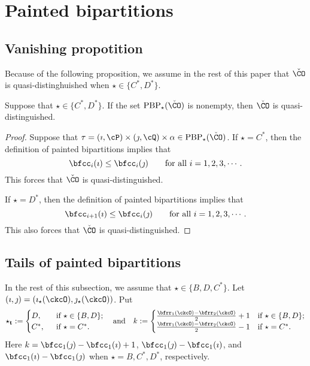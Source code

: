 \documentclass[ssunip]{subfiles}
\begin{document}
\def\oAC#1{\AC(#1)}
\def\pAC#1{\Lambda_{+}(#1)}
\def\nAC#1{\Lambda_{-}(#1)}

\section{Painted bipartitions}


\subsection{Vanishing propotition}
Because of the following proposition, we assume in the rest of this paper that $\check \CO$ is quasi-distinghuished  when $\star\in \{C^*, D^*\}$.


\begin{prop}
  Suppose that $\star\in \{C^*, D^*\}$. If the set $\mathrm{PBP}_\star(\check \CO)$ is nonempty, then $\check \CO$ is quasi-distinguished.
\end{prop}
\begin{proof}
  Suppose that $\tau=(\imath,\cP)\times(\jmath,\cQ)\times \alpha \in  \mathrm{PBP}_\star(\check \CO)$. If  $\star=C^*$, then  the definition of painted bipartitions implies that
 \[
 \bfcc_i(\imath)\leq \bfcc_i(\jmath) \qquad \textrm{for all } i=1,2,3, \cdots.
 \]
This forces that $\check \CO$ is quasi-distinguished.

 If  $\star=D^*$, then  the definition of painted bipartitions implies that
 \[
 \bfcc_{i+1}(\imath)\leq \bfcc_i(\jmath) \qquad \textrm{for all } i=1,2,3, \cdots.
 \]
This  also forces that   $\check \CO$ is quasi-distinguished.
 \end{proof}


\subsection{Tails of painted bipartitions}

In the rest of this subsection, we assume that $\star\in\{B, D, C^*\}$.
Let $(\imath,\jmath) = (\imath_{\star}(\ckcO),\jmath_{\star}(\ckcO))$.
Put
\[
  \star_{\mathbf t}:= \begin{cases}
  D, & \ \text{ if $\star\in \{B,D\}$}; \\
  C^*, &\  \text{ if $\star=C^*$}.
\end{cases}
\quad
\text{and}
\quad
k := \begin{cases}
  \frac{\bfrr_{1}(\ckcO)-\bfrr_{2}(\ckcO)}{2} + 1 &
    \text{if $\star\in \{B,D\}$}; \\
\frac{\bfrr_{1}(\ckcO)-\bfrr_{2}(\ckcO)}{2} -1 &  \text{if $\star=C^*$}.
  \end{cases}
\]
Here $k = \bfcc_{1}(\jmath)-\bfcc_{1}(\imath)+1$,
$\bfcc_{1}(\jmath)-\bfcc_{1}(\imath)$,
and $\bfcc_{1}(\imath)-\bfcc_{1}(\jmath)$
when $\star = B,C^{*},D^{*}$, respectively.
\end{document}
